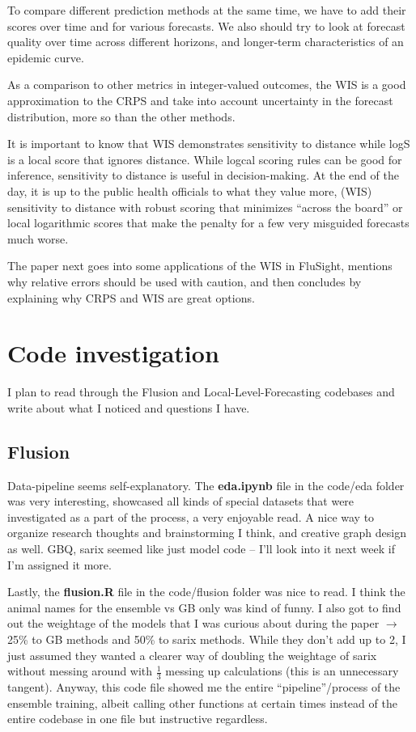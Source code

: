 \documentclass[12pt]{article}
\begin{document}
To compare different prediction methods at the same time, we have to add their scores over time and for various forecasts. We also should try to look at forecast quality over time across different horizons, and longer-term characteristics of an epidemic curve.

As a comparison to other metrics in integer-valued outcomes, the WIS is a good approximation to the CRPS and take into account uncertainty in the forecast distribution, more so than the other methods. 

It is important to know that WIS demonstrates sensitivity to distance while logS is a local score that ignores distance. While logcal scoring rules can be good for inference, sensitivity to distance is useful in decision-making. At the end of the day, it is up to the public health officials to what they value more, (WIS) sensitivity to distance with robust scoring that minimizes ``across the board'' or local logarithmic scores that make the penalty for a few very misguided forecasts much worse.

The paper next goes into some applications of the WIS in FluSight, mentions why relative errors should be used with caution, and then concludes by explaining why CRPS and WIS are great options.

\section{Code investigation}
I plan to read through the Flusion and Local-Level-Forecasting codebases and write about what I noticed and questions I have.
\subsection{Flusion}
Data-pipeline seems self-explanatory. The \textbf{eda.ipynb} file in the code/eda folder was very interesting, showcased all kinds of special datasets that were investigated as a part of the process, a very enjoyable read. A nice way to organize research thoughts and brainstorming I think, and creative graph design as well. GBQ, sarix seemed like just model code -- I'll look into it next week if I'm assigned it more. 

Lastly, the \textbf{flusion.R} file in the code/flusion folder was nice to read. I think the animal names for the ensemble vs GB only was kind of funny. I also got to find out the weightage of the models that I was curious about during the paper $\rightarrow$ 25\% to GB methods and 50\% to sarix methods. While they don't add up to 2, I just assumed they wanted a clearer way of doubling the weightage of sarix without messing around with $\frac{1}{3}$ messing up calculations (this is an unnecessary tangent). Anyway, this code file showed me the entire ``pipeline''/process of the ensemble training, albeit calling other functions at certain times instead of the entire codebase in one file but instructive regardless.
\end{document}

